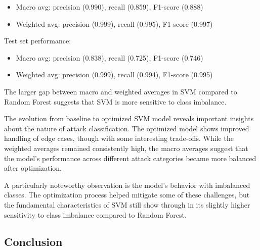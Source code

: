 \begin{itemize}
                    \begin{itemize}
                        \item Macro avg: precision (0.990), recall (0.859), F1-score (0.888)
                        \item Weighted avg: precision (0.999), recall (0.995), F1-score (0.997)
                    \end{itemize}

                    Test set performance:
                    
                    \begin{itemize}
                        \item Macro avg: precision (0.838), recall (0.725), F1-score (0.746)
                        \item Weighted avg: precision (0.999), recall (0.994), F1-score (0.995)
                    \end{itemize}

                    The larger gap between macro and weighted averages in SVM compared to Random Forest suggests that SVM is more sensitive to class imbalance.
                    
                    
                    The evolution from baseline to optimized SVM model reveals important insights about the nature of attack classification. The optimized model shows improved handling of edge cases, though with some interesting trade-offs. While the weighted averages remained consistently high, the macro averages suggest that the model's performance across different attack categories became more balanced after optimization.
            
                    A particularly noteworthy observation is the model's behavior with imbalanced classes. The optimization process helped mitigate some of these challenges, but the fundamental characteristics of SVM still show through in its slightly higher sensitivity to class imbalance compared to Random Forest.
                    

            \end{itemize}


    \subsection{Conclusion} %
    
